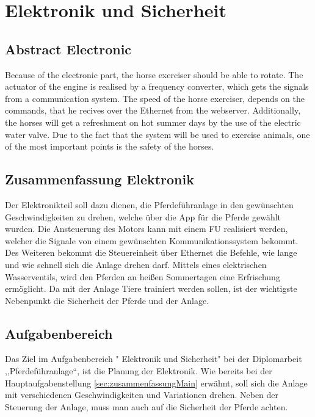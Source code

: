 \chapter{Elektronik und Sicherheit}
\label{sec:elektronikUndSicherheit}

\section{Abstract Electronic}
\label{sec:abstractETE}

Because of the electronic part, the horse exerciser should be able to rotate. 
The actuator of the engine is realised by a frequency converter, which gets the signals from a communication system.
The speed of the horse exerciser, depends on the commands, that he recives over the Ethernet from the webserver.
Additionally, the horses will get a refreshment on hot summer days by the use of the electric water valve.
Due to the fact that the system will be used to exercise animals, one of the most important points is the safety of the horses.

\section{Zusammenfassung Elektronik}
\label{sec:zusammenfassungElektronik}

Der Elektronikteil soll dazu dienen, die Pferdeführanlage in den gewünschten Geschwindigkeiten zu drehen, welche über die App für die Pferde gewählt wurden. 
Die Ansteuerung des Motors kann mit einem \ac{FU} realisiert werden, 
welcher die Signale von einem gewünschten Kommunikationssystem bekommt.
Des Weiteren bekommt die Steuereinheit über Ethernet die Befehle, wie lange und wie schnell sich die Anlage drehen darf.
Mittels eines elektrischen Wasserventils, wird den Pferden an heißen Sommertagen eine Erfrischung ermöglicht. 
Da mit der Anlage Tiere trainiert werden sollen, ist der wichtigste Nebenpunkt die Sicherheit der Pferde und der Anlage.
\newpage

\section{Aufgabenbereich}
\label{sec:aufgabenbereich}

Das Ziel im Aufgabenbereich "{} Elektronik und Sicherheit"{} bei der Diplomarbeit ,,Pferdeführanlage“, ist die Planung der Elektronik. Wie bereits bei der Hauptaufgabenstellung \ref{sec:zusammenfassungMain} erwähnt, 
soll sich die Anlage mit verschiedenen Geschwindigkeiten und Variationen drehen.  Neben der Steuerung der Anlage, muss man auch auf die Sicherheit der Pferde achten.
\newline{}

